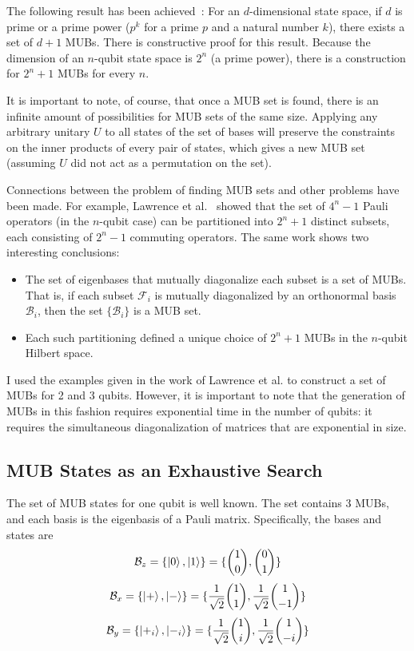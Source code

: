 \documentclass[a4paper,12pt]{article}
\newcommand{\base}{\mathcal{B}}
\newcommand{\tvect}[2]{{#1 \choose #2}}
\begin{document}
The following result has been achieved~\cite{bandyopadhyay_new_2002}:
For an $d$-dimensional state space, if $d$ is prime or a prime power ($p^k$ for a prime $p$ and a natural number $k$), there exists a set of $d+1$ MUBs.
There is constructive proof for this result.
Because the dimension of an $n$-qubit state space is $2^n$ (a prime power), there is a construction for $2^n+1$ MUBs for every $n$.

It is important to note, of course, that once a MUB set is found, there is an infinite amount of possibilities for MUB sets of the same size. Applying any arbitrary unitary $U$ to all states of the set of bases will preserve the constraints on the inner products of every pair of states, which gives a new MUB set (assuming $U$ did not act as a permutation on the set).

Connections between the problem of finding MUB sets and other problems have been made. For example, Lawrence et al.~\cite{lawrence_mutually_2002} showed that the set of $4^n-1$ Pauli operators (in the $n$-qubit case) can be partitioned into $2^n+1$ distinct subsets, each consisting of $2^n-1$ commuting operators. The same work shows two interesting conclusions:
\begin{itemize}
    \item The set of eigenbases that mutually diagonalize each subset is a set of MUBs.
    That is, if each subset $\mathcal{F}_i$ is mutually diagonalized by an orthonormal basis $\base_i$, then the set $\{\base_i\}$ is a MUB set.
    \item Each such partitioning defined a unique choice of $2^n+1$ MUBs in the $n$-qubit Hilbert space.
\end{itemize}

I used the examples given in the work of Lawrence et al. to construct a set of MUBs for 2 and 3 qubits.
However, it is important to note that the generation of MUBs in this fashion requires exponential time in the number of qubits: it requires the simultaneous diagonalization of matrices that are exponential in size.

\subsection{MUB States as an Exhaustive Search}

The set of MUB states for one qubit is well known. The set contains 3 MUBs, and each basis is the eigenbasis of a Pauli matrix.
Specifically, the bases and states are
$$ \base_z = \{ \ket{0}, \ket{1}\}  = \{\tvect{1}{0}, \tvect{0}{1}\}$$
$$ \base_x = \{ \ket{+}, \ket{-}\}  = \{\frac{1}{\sqrt{2}}\tvect{1}{1}, \frac{1}{\sqrt{2}}\tvect{1}{-1}\}$$
$$ \base_y = \{ \ket{+_i}, \ket{-_i}\}  = \{\frac{1}{\sqrt{2}}\tvect{1}{i}, \frac{1}{\sqrt{2}}\tvect{1}{-i}\}$$
\end{document}
